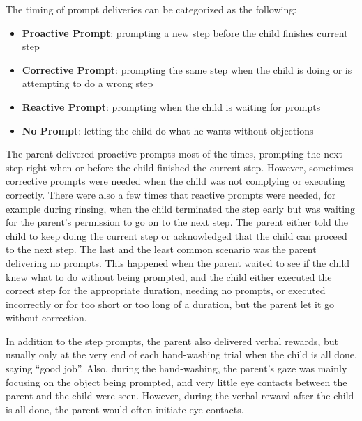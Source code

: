 The timing of prompt deliveries can be categorized as the following:
\begin{itemize}
	\item \textbf{Proactive Prompt}: prompting a new step before the child finishes current step
	\item \textbf{Corrective Prompt}: prompting the same step when the child is doing or is attempting to do a wrong step
	\item \textbf{Reactive Prompt}: prompting when the child is waiting for prompts
	\item \textbf{No Prompt}: letting the child do what he wants without objections
\end{itemize}
The parent delivered proactive prompts most of the times, prompting the next step right when or before the child finished the current step.  However, sometimes corrective prompts were needed when the child was not complying or executing correctly.  There were also a few times that reactive prompts were needed, for example during rinsing, when the child terminated the step early but was waiting for the parent's permission to go on to the next step.  The parent either told the child to keep doing the current step or acknowledged that the child can proceed to the next step.  The last and the least common scenario was the parent delivering no prompts.  This happened when the parent waited to see if the child knew what to do without being prompted, and the child either executed the correct step for the appropriate duration, needing no prompts, or executed incorrectly or for too short or too long of a duration, but the parent let it go without correction.

In addition to the step prompts, the parent also delivered verbal rewards, but usually only at the very end of each hand-washing trial when the child is all done, saying ``good job''.  Also, during the hand-washing, the parent's gaze was mainly focusing on the object being prompted, and very little eye contacts between the parent and the child were seen.  However, during the verbal reward after the child is all done, the parent would often initiate eye contacts.

